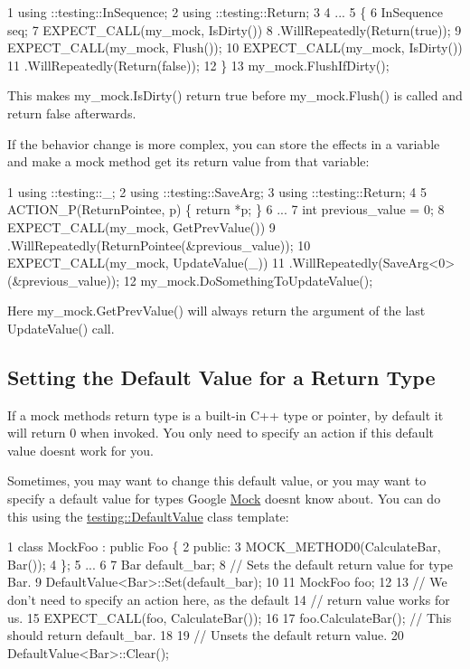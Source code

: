 \begin{DoxyCode}
1 using ::testing::InSequence;
2 using ::testing::Return;
3 
4 ...
5   \{
6     InSequence seq;
7     EXPECT\_CALL(my\_mock, IsDirty())
8         .WillRepeatedly(Return(true));
9     EXPECT\_CALL(my\_mock, Flush());
10     EXPECT\_CALL(my\_mock, IsDirty())
11         .WillRepeatedly(Return(false));
12   \}
13   my\_mock.FlushIfDirty();
\end{DoxyCode}


This makes {\ttfamily my\+\_\+mock.\+Is\+Dirty()} return {\ttfamily true} before {\ttfamily my\+\_\+mock.\+Flush()} is called and return {\ttfamily false} afterwards.

If the behavior change is more complex, you can store the effects in a variable and make a mock method get its return value from that variable\+:


\begin{DoxyCode}
1 using ::testing::\_;
2 using ::testing::SaveArg;
3 using ::testing::Return;
4 
5 ACTION\_P(ReturnPointee, p) \{ return *p; \}
6 ...
7   int previous\_value = 0;
8   EXPECT\_CALL(my\_mock, GetPrevValue())
9       .WillRepeatedly(ReturnPointee(&previous\_value));
10   EXPECT\_CALL(my\_mock, UpdateValue(\_))
11       .WillRepeatedly(SaveArg<0>(&previous\_value));
12   my\_mock.DoSomethingToUpdateValue();
\end{DoxyCode}


Here {\ttfamily my\+\_\+mock.\+Get\+Prev\+Value()} will always return the argument of the last {\ttfamily Update\+Value()} call.

\subsection*{Setting the Default Value for a Return Type}

If a mock method\textquotesingle{}s return type is a built-\/in C++ type or pointer, by default it will return 0 when invoked. You only need to specify an action if this default value doesn\textquotesingle{}t work for you.

Sometimes, you may want to change this default value, or you may want to specify a default value for types Google \hyperlink{class_mock}{Mock} doesn\textquotesingle{}t know about. You can do this using the {\ttfamily \hyperlink{classtesting_1_1_default_value}{testing\+::\+Default\+Value}} class template\+:


\begin{DoxyCode}
1 class MockFoo : public Foo \{
2  public:
3   MOCK\_METHOD0(CalculateBar, Bar());
4 \};
5 ...
6 
7   Bar default\_bar;
8   // Sets the default return value for type Bar.
9   DefaultValue<Bar>::Set(default\_bar);
10 
11   MockFoo foo;
12 
13   // We don't need to specify an action here, as the default
14   // return value works for us.
15   EXPECT\_CALL(foo, CalculateBar());
16 
17   foo.CalculateBar();  // This should return default\_bar.
18 
19   // Unsets the default return value.
20   DefaultValue<Bar>::Clear();
\end{DoxyCode}


